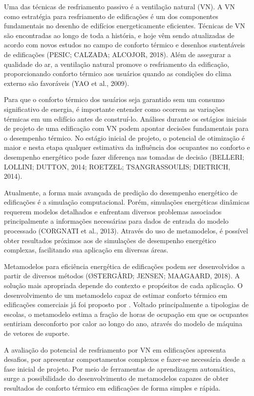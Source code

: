 \documentclass[brazil,hardcopy,openany,a5paper]{ufscthesis}
\begin{document}
Uma das técnicas de resfriamento passivo é a ventilação natural (VN). A VN como estratégia para resfriamento de edificações é um dos componentes fundamentais no desenho de edifícios energeticamente eficientes. Técnicas de VN são encontradas ao longo de toda a história, e hoje vêm sendo atualizadas de acordo com novos estudos no campo de conforto térmico e desenhos sustentáveis de edificações (PESIC; CALZADA; ALCOJOR, 2018). Além de assegurar a qualidade do ar, a ventilação natural promove o resfriamento da edificação, proporcionando conforto térmico aos usuários quando as condições do clima externo são favoráveis (YAO et al., 2009).

Para que o conforto térmico dos usuários seja garantido sem um consumo significativo de energia, é importante entender como ocorrem as variações térmicas em um edifício antes de construí-lo. Análises durante os estágios iniciais de projeto de uma edificação com VN podem apontar decisões fundamentais para o desempenho térmico. No estágio inicial de projeto, o potencial de otimização é maior e nesta etapa qualquer estimativa da influência dos ocupantes no conforto e desempenho energético pode fazer diferença nas tomadas de decisão (BELLERI; LOLLINI; DUTTON, 2014; ROETZEL; TSANGRASSOULIS; DIETRICH, 2014).

Atualmente, a forma mais avançada de predição do desempenho energético de edificações é a simulação computacional. Porém, simulações energéticas dinâmicas requerem modelos detalhados e enfrentam diversos problemas associados principalmente a informações necessárias para dados de entrada do modelo processado (CORGNATI et al., 2013). Através do uso de metamodelos, é possível obter resultados próximos aos de simulações de desempenho energético complexas, facilitando sua aplicação em diversas áreas.

Metamodelos para eficiência energética de edificações podem ser desenvolvidos a partir de diversos métodos (ØSTERGÅRD; JENSEN; MAAGAARD, 2018). A solução mais apropriada depende do contexto e propósitos de cada aplicação. O desenvolvimento de um metamodelo capaz de estimar conforto térmico em edificações comerciais já foi proposto por  \cite{Rackes2016}. Voltado principalmente a tipologias de escolas, o metamodelo estima a fração de horas de ocupação em que os ocupantes sentiriam desconforto por calor ao longo do ano, através do modelo de máquina de vetores de suporte.

A avaliação do potencial de resfriamento por VN em edificações apresenta desafios, por apresentar comportamentos complexos e fazer-se necessária desde a fase inicial de projeto. Por meio de ferramentas de aprendizagem automática, surge a possibilidade do desenvolvimento de metamodelos capazes de obter resultados de conforto térmico em edificações de forma simples e rápida.
\end{document}
